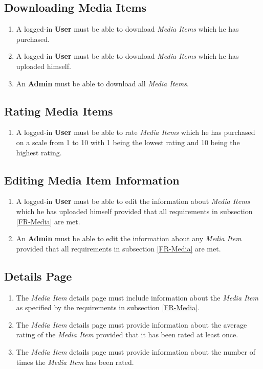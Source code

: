 \subsection {Downloading Media Items}

\begin{enumerate}[label=FR-\twodigits*, resume]
	\item A logged-in \textbf{User} must be able to download \textit{Media Items} which he has purchased.
	\item A logged-in \textbf{User} must be able to download \textit{Media Items} which he has uploaded himself.
	\item An \textbf{Admin} must be able to download all \textit{Media Items}.
\end{enumerate}
		
\subsection {Rating Media Items} \label{FR-RatingMedia}

\begin{enumerate}[label=FR-\twodigits*, resume]
	\item A logged-in \textbf{User} must be able to rate \textit{Media Items} which he has purchased on a scale from 1 to 10 with 1 being the lowest rating and 10 being the highest rating.
\end{enumerate}

\subsection{Editing Media Item Information}

\begin{enumerate}[label=FR-\twodigits*, resume]
	\item A logged-in \textbf{User} must be able to edit the information about \textit{Media Items} which he has uploaded himself provided that all requirements in subsection \ref{FR-Media} are met.
	\item An \textbf{Admin} must be able to edit the information about any \textit{Media Item} provided that all requirements in subsection \ref{FR-Media} are met.
\end{enumerate}
			
\subsection {Details Page}

\begin{enumerate}[label=FR-\twodigits*, resume]
	\item The \textit{Media Item} details page must include information about the \textit{Media Item} as specified by the requirements in subsection \ref{FR-Media}.
	\item The \textit{Media Item} details page must provide information about the average rating of the \textit{Media Item} provided that it has been rated at least once.
	\item The \textit{Media Item} details page must provide information about the number of times the \textit{Media Item} has been rated.
\end{enumerate}
			
